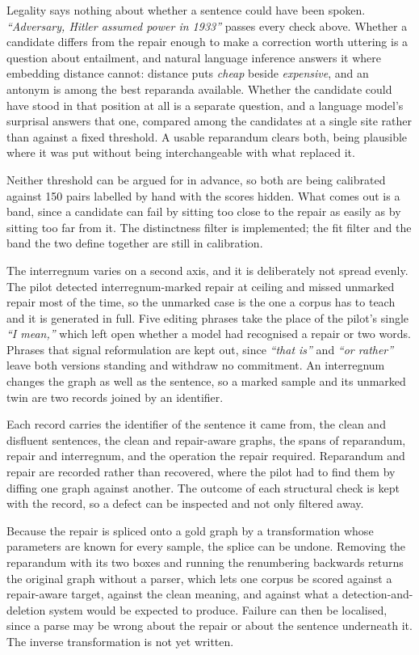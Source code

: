 \documentclass{article}
\begin{document}
Legality says nothing about whether a sentence could have been spoken.
\textit{``Adversary, Hitler assumed power in 1933''} passes every check above.
Whether a candidate differs from the repair enough to make a correction worth
uttering is a question about entailment, and natural language inference answers it
where embedding distance cannot: distance puts \textit{cheap} beside
\textit{expensive}, and an antonym is among the best reparanda available. Whether
the candidate could have stood in that position at all is a separate question, and
a language model's surprisal answers that one, compared among the candidates at a
single site rather than against a fixed threshold. A usable reparandum clears
both, being plausible where it was put without being interchangeable with what
replaced it.

Neither threshold can be argued for in advance, so both are being calibrated
against 150 pairs labelled by hand with the scores hidden. What comes out is a
band, since a candidate can fail by sitting too close to the repair as easily as
by sitting too far from it. The distinctness filter is implemented; the fit filter
and the band the two define together are still in calibration.

The interregnum varies on a second axis, and it is deliberately not spread evenly.
The pilot detected interregnum-marked repair at ceiling and missed unmarked repair
most of the time, so the unmarked case is the one a corpus has to teach and it is
generated in full. Five editing phrases take the place of the pilot's single
\textit{``I mean,''} which left open whether a model had recognised a repair or two
words. Phrases that signal reformulation are kept out, since \textit{``that is''}
and \textit{``or rather''} leave both versions standing and withdraw no
commitment. An interregnum changes the graph as well as the sentence, so a marked
sample and its unmarked twin are two records joined by an identifier.

Each record carries the identifier of the sentence it came from, the clean and
disfluent sentences, the clean and repair-aware graphs, the spans of reparandum,
repair and interregnum, and the operation the repair required. Reparandum and
repair are recorded rather than recovered, where the pilot had to find them by
diffing one graph against another. The outcome of each structural check is kept
with the record, so a defect can be inspected and not only filtered away.

Because the repair is spliced onto a gold graph by a transformation whose
parameters are known for every sample, the splice can be undone. Removing the
reparandum with its two boxes and running the renumbering backwards returns the
original graph without a parser, which lets one corpus be scored against a
repair-aware target, against the clean meaning, and against what a
detection-and-deletion system would be expected to produce. Failure can then be
localised, since a parse may be wrong about the repair or about the sentence
underneath it. The inverse transformation is not yet written.
\end{document}
